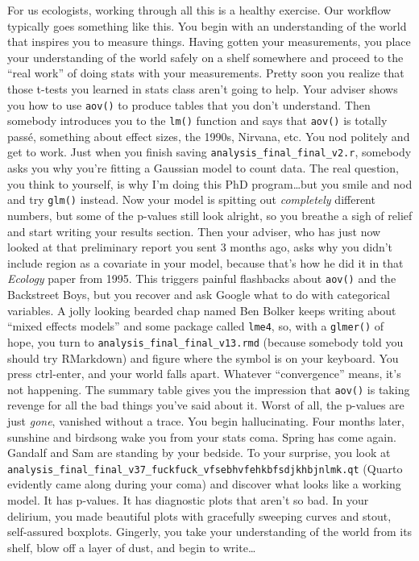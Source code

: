 \documentclass[
]{article}
\begin{document}
For us ecologists, working through all this is a healthy exercise. Our
workflow typically goes something like this. You begin with an
understanding of the world that inspires you to measure things. Having
gotten your measurements, you place your understanding of the world
safely on a shelf somewhere and proceed to the ``real work'' of doing
stats with your measurements. Pretty soon you realize that those t-tests
you learned in stats class aren't going to help. Your adviser shows you
how to use \texttt{aov()} to produce tables that you don't understand.
Then somebody introduces you to the \texttt{lm()} function and says that
\texttt{aov()} is totally passé, something about effect sizes, the
1990s, Nirvana, etc. You nod politely and get to work. Just when you
finish saving \texttt{analysis\_final\_final\_v2.r}, somebody asks you
why you're fitting a Gaussian model to count data. The real question,
you think to yourself, is why I'm doing this PhD program\ldots but you
smile and nod and try \texttt{glm()} instead. Now your model is spitting
out \emph{completely} different numbers, but some of the p-values still
look alright, so you breathe a sigh of relief and start writing your
results section. Then your adviser, who has just now looked at that
preliminary report you sent 3 months ago, asks why you didn't include
region as a covariate in your model, because that's how he did it in
that \emph{Ecology} paper from 1995. This triggers painful flashbacks
about \texttt{aov()} and the Backstreet Boys, but you recover and ask
Google what to do with categorical variables. A jolly looking bearded
chap named Ben Bolker keeps writing about ``mixed effects models'' and
some package called \texttt{lme4}, so, with a \texttt{glmer()} of hope,
you turn to \texttt{analysis\_final\_final\_v13.rmd} (because somebody
told you should try RMarkdown) and figure where the \textbar{} symbol is
on your keyboard. You press ctrl-enter, and your world falls apart.
Whatever ``convergence'' means, it's not happening. The summary table
gives you the impression that \texttt{aov()} is taking revenge for all
the bad things you've said about it. Worst of all, the p-values are just
\emph{gone}, vanished without a trace. You begin hallucinating. Four
months later, sunshine and birdsong wake you from your stats coma.
Spring has come again. Gandalf and Sam are standing by your bedside. To
your surprise, you look at
\texttt{analysis\_final\_final\_v37\_fuckfuck\_vfsebhvfehkbfsdjkhbjnlmk.qt}
(Quarto evidently came along during your coma) and discover what looks
like a working model. It has p-values. It has diagnostic plots that
aren't so bad. In your delirium, you made beautiful plots with
gracefully sweeping curves and stout, self-assured boxplots. Gingerly,
you take your understanding of the world from its shelf, blow off a
layer of dust, and begin to write\ldots{}
\end{document}
